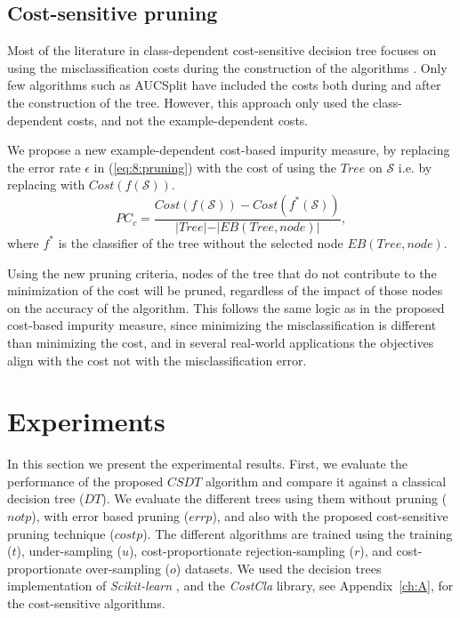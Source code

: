 	\subsection{Cost-sensitive pruning}
 
		Most of the literature in class-dependent cost-sensitive decision tree focuses on using the 
		misclassification costs during the construction of the algorithms \citep{Lomax2013}. Only few 
		algorithms such as AUCSplit \citep{Ferri2002} have \mbox{included} the costs both during and 
		after the construction of the tree. However, this approach only used the class-dependent costs, 
		and not the example-dependent costs.
 
		We propose a new example-dependent cost-based impurity measure, by replacing the error rate 
		$\epsilon$ in (\ref{eq:8:pruning}) with the cost of using the $Tree$ on $\mathcal{S}$ i.e. by 
    replacing with 	$Cost(f(\mathcal{S}))$.
		\begin{equation}\label{eq:8:cost_pruning}
			PC_{c} = \frac{ Cost(f(\mathcal{S})) - Cost(f^*(\mathcal{S})) }
		  {\vert Tree\vert-\vert EB(Tree,node)\vert} ,
		\end{equation}
		where $f^*$ is the classifier of the tree without the selected node $EB(Tree,node)$.
 
		Using the new pruning criteria, nodes of the tree that do not contribute to the minimization of 
		the cost will be pruned, regardless of the impact of those nodes on the accuracy of the
		algorithm. This follows the same logic as in the proposed cost-based impurity measure, since 
		minimizing the misclassification is different than minimizing the cost, and in several 
		real-world applications the objectives align with the cost not with the misclassification error.
		
\section{Experiments}
\label{sec:8:experiments}

In this section we present the experimental results. First, we evaluate the performance of the 
proposed $CSDT$ algorithm and compare it against a classical decision tree ($DT$). We evaluate 
the different trees using them without pruning ($not p$), with error based pruning ($err p$), 
and also with the proposed cost-sensitive pruning technique ($cost p$). The different algorithms 
are trained using the training ($t$), under-sampling ($u$), cost-proportionate rejection-sampling 
($r$), and cost-proportionate over-sampling ($o$) datasets. We used the decision trees 
implementation of \textit{Scikit-learn} \citep{Pedregosa2011}, and the \textit{CostCla} library, see 
Appendix~\ref{ch:A}, for the cost-sensitive algorithms.

